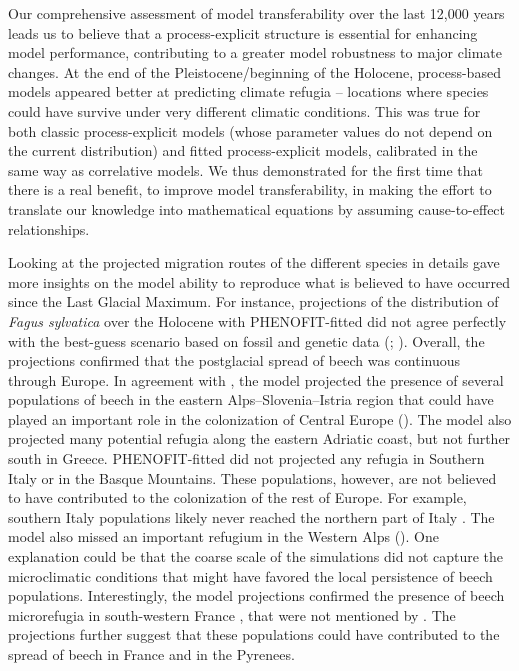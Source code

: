 Our comprehensive assessment of model transferability over the last 12,000 years leads us to believe that a process-explicit structure is essential for enhancing model performance, contributing to a greater model robustness to major climate changes. At the end of the Pleistocene/beginning of the Holocene, process-based models appeared better at predicting climate refugia -- locations where species could have survive under very different climatic conditions.
This was true for both classic process-explicit models (whose parameter values do not depend on the current distribution) and fitted process-explicit models, calibrated in the same way as correlative models. We thus demonstrated for the first time that there is a real benefit, to improve model transferability, in making the effort to translate our knowledge into mathematical equations by assuming cause-to-effect relationships. 

Looking at the projected migration routes of the different species in details gave more insights on the model ability to reproduce what is believed to have occurred since the Last Glacial Maximum. For instance, projections of the distribution of \emph{Fagus sylvatica} over the Holocene with PHENOFIT-fitted did not agree perfectly with the best-guess scenario based on fossil and genetic data (; \citealp{Magri2006}). Overall, the projections confirmed that the postglacial spread of beech was continuous through Europe. In agreement with \citet{Magri2006}, the model projected the presence of several populations of beech in the eastern Alps–Slovenia–Istria region that could have played an important role in the colonization of Central Europe (). The model  also projected many potential refugia along the eastern Adriatic coast, but not further south in Greece. PHENOFIT-fitted did not projected any refugia in Southern Italy or in the Basque Mountains. These populations, however, are not believed to have contributed to the colonization of the rest of Europe. For example, southern Italy populations likely never reached the northern part of Italy \citep{Magri2006}. The model also missed an important refugium in the Western Alps (). One explanation could be that the coarse scale of the simulations did not capture the microclimatic conditions that might have favored the local persistence of beech populations. Interestingly, the model projections confirmed the presence of beech microrefugia in south-western France \citep{Lafontaine2014}, that were not mentioned by \citet{Magri2006}. The projections further suggest that these populations could have contributed to the spread of beech in France and in the Pyrenees.

